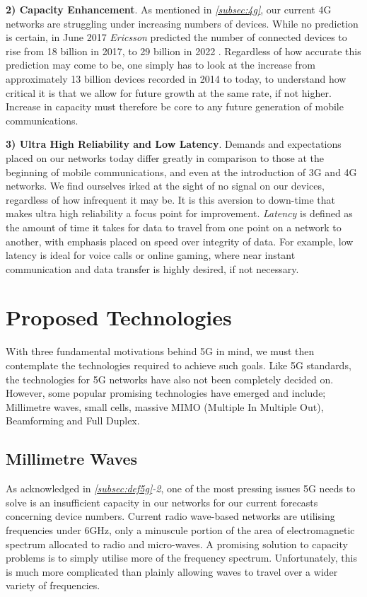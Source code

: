 \documentclass[journal]{IEEEtran}
\begin{document}
\textbf{2) Capacity Enhancement}. As mentioned in \textit{\ref{subsec:4g}}, our current 4G networks are struggling under increasing numbers of devices. While no prediction is certain, in June 2017 \textit{Ericsson} predicted the number of connected devices to rise from 18 billion in 2017, to 29 billion in 2022 \cite{ericssondev}. Regardless of how accurate this prediction may come to be, one simply has to look at the increase from approximately 13 billion devices recorded in 2014 \cite{ericssondev} to today, to understand how critical it is that we allow for future growth at the same rate, if not higher. Increase in capacity must therefore be core to any future generation of mobile communications.

\textbf{3) Ultra High Reliability and Low Latency}. Demands and expectations placed on our networks today differ greatly in comparison to those at the beginning of mobile communications, and even at the introduction of 3G and 4G networks. We find ourselves irked at the sight of no signal on our devices, regardless of how infrequent it may be. It is this aversion to down-time that makes ultra high reliability a focus point for improvement. \textit{Latency} is defined as the amount of time it takes for data to travel from one point on a network to another, with emphasis placed on speed over integrity of data. For example, low latency is ideal for voice calls or online gaming, where near instant communication and data transfer is highly desired, if not necessary.

\section{Proposed Technologies}

With three fundamental motivations behind 5G in mind, we must then contemplate the technologies required to achieve such goals. Like 5G standards, the technologies for 5G networks have also not been completely decided on. However, some popular promising technologies have emerged and include; Millimetre waves, small cells, massive MIMO (Multiple In Multiple Out), Beamforming and Full Duplex.

\subsection{Millimetre Waves}
As acknowledged in \textit{\ref{subsec:def5g}-2}, one of the most pressing issues 5G needs to solve is an insufficient capacity in our networks for our current forecasts concerning device numbers. Current radio wave-based networks are utilising frequencies under 6GHz, only a minuscule portion of the area of electromagnetic spectrum allocated to radio and micro-waves. A promising solution to capacity problems is to simply utilise more of the frequency spectrum. Unfortunately, this is much more complicated than plainly allowing waves to travel over a wider variety of frequencies. 
\end{document}
